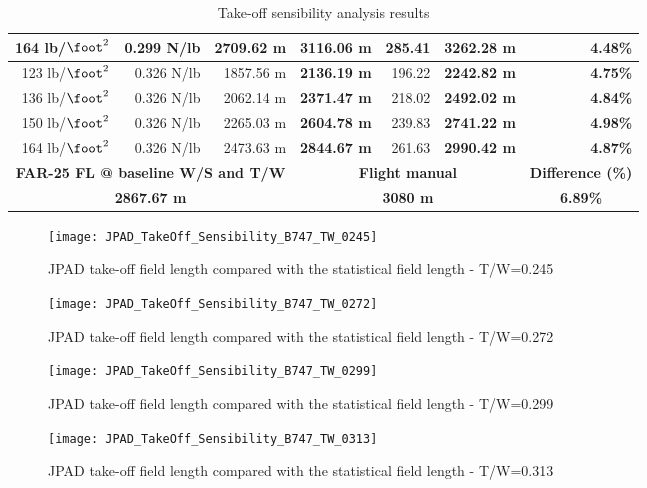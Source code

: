 \begin{table}[H]
{\begin{tabular}{r|r|r|r|r|r|r}
    164 lb/$\si{\square\foot}$ & 0.299 N/lb & 2709.62 m & \textbf{3116.06 m} & 285.41  & \textbf{3262.28 m} & \textbf{4.48\%}\\
    \midrule
    123 lb/$\si{\square\foot}$& 0.326 N/lb & 1857.56 m & \textbf{2136.19 m} & 196.22 & \textbf{2242.82 m} & \textbf{4.75\%} \\
    136 lb/$\si{\square\foot}$ & 0.326 N/lb & 2062.14 m & \textbf{2371.47 m} & 218.02 & \textbf{2492.02 m} & \textbf{4.84\%} \\
    150 lb/$\si{\square\foot}$ & 0.326 N/lb & 2265.03 m & \textbf{2604.78 m} & 239.83 & \textbf{2741.22 m} & \textbf{4.98\%} \\
    164 lb/$\si{\square\foot}$ & 0.326 N/lb & 2473.63 m & \textbf{2844.67 m} & 261.63 & \textbf{2990.42 m} & \textbf{4.87\%} \\
    \midrule
    \midrule
    \multicolumn{3}{c}{\textbf{FAR-25 FL @ baseline W/S and T/W}} & \multicolumn{3}{c}{\textbf{Flight manual}} & \multicolumn{1}{c}{\textbf{Difference (\%)}}\\
    \midrule
     \multicolumn{3}{c}{\textbf{2867.67 m}} &  \multicolumn{3}{c}{\textbf{3080 m}} &  \multicolumn{1}{c}{\textbf{6.89\%}}\\
    \bottomrule
    \end{tabular}
    }
      \caption{Take-off sensibility analysis results}
      \label{tab:TakeOffExcel}
\end{table}
%
\clearpage
%
\begin{figure}[H]
\centering
\texttt{[image: JPAD\_TakeOff\_Sensibility\_B747\_TW\_0245]}
\caption{\gls{JPAD} take-off field length compared with the statistical field length - T/W=0.245}
\end{figure}
%
\begin{figure}[H]
\centering
\texttt{[image: JPAD\_TakeOff\_Sensibility\_B747\_TW\_0272]}
\caption{\gls{JPAD} take-off field length compared with the statistical field length - T/W=0.272}
\end{figure}
%
\begin{figure}[H]
\centering
\texttt{[image: JPAD\_TakeOff\_Sensibility\_B747\_TW\_0299]}
\caption{\gls{JPAD} take-off field length compared with the statistical field length - T/W=0.299}
\end{figure}
%
\begin{figure}[H]
\centering
\texttt{[image: JPAD\_TakeOff\_Sensibility\_B747\_TW\_0313]}
\caption{\gls{JPAD} take-off field length compared with the statistical field length - T/W=0.313}
\end{figure}
